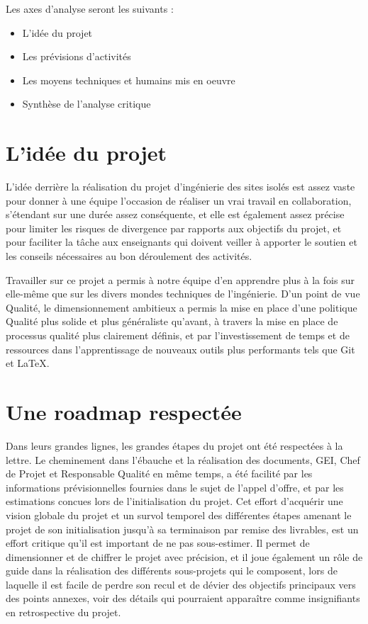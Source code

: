 \documentclass[a4paper]{article}
\begin{document}
Les axes d'analyse seront les suivants :

\begin{itemize}
\item L'idée du projet
\item Les prévisions d'activités
\item Les moyens techniques et humains mis en oeuvre
\item Synthèse de l'analyse critique
\end{itemize}

\section{L'idée du projet}

L'idée derrière la réalisation du projet d'ingénierie des sites isolés est assez vaste pour donner à une équipe l'occasion de réaliser un vrai travail en collaboration, s'étendant sur une durée assez conséquente, et elle est également assez précise pour limiter les risques de divergence par rapports aux objectifs du projet, et pour faciliter la tâche aux enseignants qui doivent veiller à apporter le soutien et les conseils nécessaires au bon déroulement des activités.

Travailler sur ce projet a permis à notre équipe d'en apprendre plus à la fois sur elle-même que sur les divers mondes techniques de l'ingénierie. D'un point de vue Qualité, le dimensionnement ambitieux a permis la mise en place d'une politique Qualité plus solide et plus généraliste qu'avant, à travers la mise en place de processus qualité plus clairement définis, et par l'investissement de temps et de ressources dans l'apprentissage de nouveaux outils plus performants tels que Git et LaTeX.

\section{Une roadmap respectée}

Dans leurs grandes lignes, les grandes étapes du projet ont été respectées à la lettre. Le cheminement dans l'ébauche et la réalisation des documents, GEI, Chef de Projet et Responsable Qualité en même temps, a été facilité par les informations prévisionnelles fournies dans le sujet de l'appel d'offre, et par les estimations concues lors de l'initialisation du projet. Cet effort d'acquérir une vision globale du projet et un survol temporel des différentes étapes amenant le projet de son initialisation jusqu'à sa terminaison par remise des livrables, est un effort critique qu'il est important de ne pas sous-estimer. Il permet de dimensionner et de chiffrer le projet avec précision, et il joue également un rôle de guide dans la réalisation des différents sous-projets qui le composent, lors de laquelle il est facile de perdre son recul et de dévier des objectifs principaux vers des points annexes, voir des détails qui pourraient apparaître comme insignifiants en retrospective du projet.
\end{document}
